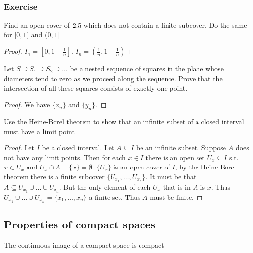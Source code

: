 \documentclass[11pt]{article}
\begin{document}
\subsubsection{Exercise}
\label{sec:orgd94122a}
\begin{exercise}
Find an open cover of \(2.5\) which does not contain a finite subcover. Do
the same for \([0,1)\) and \((0,1]\)
\end{exercise}
\begin{proof}
\(I_n=[0,1-\frac{1}{n}]\). \(I_n=(\frac{1}{n},1-\frac{1}{n})\)
\end{proof}

\begin{exercise}
Let \(S\supseteq S_1\supseteq S_2\supseteq\dots\) be a nested sequence of
squares in the plane whose diameters tend to zero as we proceed along the
sequence. Prove that the intersection of all these squares consists of
exactly one point.
\end{exercise}

\begin{proof}
We have \(\{x_n\}\) and \(\{y_n\}\).
\end{proof}

\begin{exercise}
Use the Heine-Borel theorem to show that an infinite subset of a closed
interval must have a limit point
\end{exercise}

\begin{proof}
Let \(I\) be a closed interval. Let \(A\subseteq I\) be an infinite subset.
Suppose \(A\) does not have any limit points. Then for each \(x\in I\) there
is an open set \(U_x\subseteq I\) s.t. \(x\in U_x\) and \(U_x\cap
    A-\{x\}=\emptyset\). \(\{U_x\}\) is an open cover of \(I\), by the
Heine-Borel theorem there is a finite subcover
\(\{U_{x_1},\dots,U_{x_n}\}\).  It must be that \(A\subseteq
    U_{x_1}\cup\dots\cup U_{x_n}\). But the only element of each \(U_x\) that is
in \(A\) is \(x\). Thus \(U_{x_1}\cup\dots\cup U_{x_n}=\{x_1,\dots,x_n\}\) a
finite set. Thus \(A\) must be finite.
\end{proof}

\subsection{Properties of compact spaces}
\label{sec:org311d403}
\begin{theorem}[]
\label{thm3.4}
The continuous image of a compact space is compact
\end{theorem}
\end{document}
